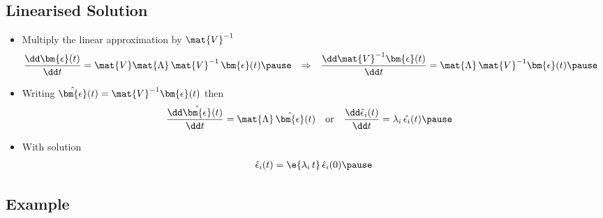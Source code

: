 
\begin{slide}
\section[-2]{Linearised Solution}

\begin{PauseHighLight}
  \begin{itemize}
  \item Multiply the linear approximation by $\mat{V}^{-1}$
    \begin{align*}
    \frac{\dd \bm{\epsilon}(t)}{\dd t}
      &= \mat{V} \mat{\Lambda}\,\mat{V}^{-1}\, \bm{\epsilon}(t)\pause
    & \Rightarrow &&
      \frac{\dd \mat{V}^{-1}\bm{\epsilon}(t)}{\dd t} 
      &= \mat{\Lambda}\, \mat{V}^{-1}\bm{\epsilon}(t)\pause
    \end{align*}
  \item Writing $\hat{\bm{\epsilon}}(t) = \mat{V}^{-1}\bm{\epsilon}(t)$ then
    \begin{align*}
      \frac{\dd \hat{\bm{\epsilon}}(t)}{\dd t} 
      &= \mat{\Lambda}\, \hat{\bm{\epsilon}}(t) & &\text{or} &
      \frac{\dd \hat{\epsilon}_i(t)}{\dd t} 
      &= \lambda_i\, \hat{\epsilon_i}(t)\pause
    \end{align*}
  \item With solution
    \begin{align*}
      \hat{\epsilon}_i(t) = \e{\lambda_i\,t}
      \,\hat{\epsilon}_i(0)\pause
    \end{align*}
  \end{itemize}
\end{PauseHighLight}

\end{slide}


\begin{slide}
\section[-2]{Example}

\pause
\pb {}
\begin{center}
  \pause
\end{center}
\end{slide}



